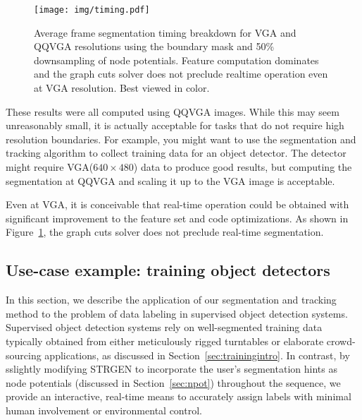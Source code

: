 \documentclass[graybox]{svmult}
\newcommand{\vga}{VGA\xspace}
\newcommand{\qqvga}{QQVGA\xspace}
\newcommand{\todoCR}[1]{\textcolor{blue}{}}
\begin{document}
\begin{figure}
  \centering
  \texttt{[image: img/timing.pdf]}
  \caption{Average frame segmentation timing breakdown for \vga and \qqvga resolutions using the boundary mask and 50\% downsampling of node potentials.  Feature computation dominates and the graph cuts solver does not preclude realtime operation even at \vga resolution.  Best viewed in color. \todoCR{Should probably collect a 640x480 dataset, make a scaled-down copy, and compute timing results for that data.  This way, you can make an exact comparison.  As it is, the two sets of sequences are not exactly the same.  The reported claims are supported by the current plot, but it'd be nice for one to be able to make the comparison between the two total times.}}
  \label{fig:timing}
\end{figure}


These results were all computed using \qqvga images.  While this may seem unreasonably small, it is actually acceptable for tasks that do not require high resolution boundaries.  For example, you might want to use the segmentation and tracking algorithm to collect training data for an object detector.  The detector might require \vga (\ie $640 \times 480$) data to produce good results, but computing the segmentation at \qqvga and scaling it up to the \vga image is acceptable.

Even at \vga, it is conceivable that real-time operation could be obtained with significant improvement to the feature set and code optimizations.  As shown in Figure~\ref{fig:timing}, the graph cuts solver does not preclude real-time segmentation.

\subsection{Use-case example: training object detectors}
\label{sec:example}

In this section, we describe the application of our segmentation and tracking method to the problem of data labeling in supervised object detection systems. Supervised object detection systems rely on well-segmented training data typically obtained from either meticulously rigged turntables or elaborate crowd-sourcing applications, as discussed in Section~\ref{sec:trainingintro}. In contrast, by sslightly modifying STRGEN to incorporate the user's segmentation hints as node potentials (discussed in Section~\ref{sec:npot}) throughout the sequence, we provide an interactive, real-time means to accurately assign labels with minimal human involvement or environmental control.
\end{document}
